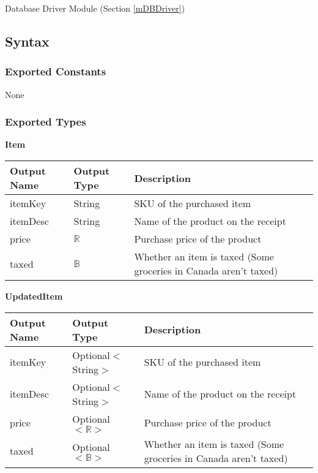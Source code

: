 \documentclass[12pt, titlepage]{article}
\begin{document}
Database Driver Module (Section \ref{mDBDriver})

\subsection{Syntax}

\subsubsection{Exported Constants}

None

\subsubsection{Exported Types}

\textbf{Item}

\begin{table}[H]
  \begin{tabular}{|p{}|p{}|p{}|}
    \hline
    \textbf{Output Name} & \textbf{Output Type} & \textbf{Description} \\
    \hline
    itemKey & String & SKU of the purchased item \\
    \hline
    itemDesc & String & Name of the product on the receipt \\
    \hline
    price & $\mathbb{R}$ & Purchase price of the product \\
    \hline
    taxed & $\mathbb{B}$ & Whether an item is taxed (Some groceries in Canada aren't taxed) \\
    \hline
  \end{tabular}
\end{table}

\textbf{UpdatedItem}

\begin{table}[H]
  \begin{tabular}{|p{}|p{}|p{}|}
    \hline
    \textbf{Output Name} & \textbf{Output Type} & \textbf{Description} \\
    \hline
    itemKey & Optional$<$String$>$ & SKU of the purchased item \\
    \hline
    itemDesc & Optional$<$String$>$ & Name of the product on the receipt \\
    \hline
    price & Optional$<\mathbb{R}>$ & Purchase price of the product \\
    \hline
    taxed & Optional$<\mathbb{B}>$ & Whether an item is taxed (Some groceries in Canada aren't taxed) \\
    \hline
  \end{tabular}
\end{table}
\end{document}
